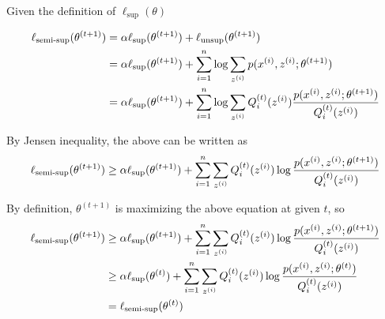 \begin{answer}

Given the definition of $\ell_\text{sup}(\theta)$

\begin{align}
    \ell_{\text{semi-sup}}(\theta^{(t+1)}) &= \alpha \ell_\text{sup}(\theta^{(t+1)}) + \ell_\text{unsup}(\theta^{(t+1)}) \\
    &= \alpha \ell_\text{sup}(\theta^{(t+1)}) +  \sum_{i=1}^{n} \log \sum_{z^{(i)}} p(x^{(i)},z^{(i)};\theta^{(t+1)}) \\
    &=  \alpha \ell_\text{sup}(\theta^{(t+1)}) +  \sum_{i=1}^{n} \log \sum_{z^{(i)}} Q^{(t)}_i(z^{(i)}) \frac{p(x^{(i)},z^{(i)};\theta^{(t+1)})}{Q^{(t)}_i(z^{(i)})} 
\end{align}

By Jensen inequality, the above can be written as 
\begin{align}
    \ell_{\text{semi-sup}}(\theta^{(t+1)}) \ge \alpha \ell_\text{sup}(\theta^{(t+1)}) + \sum_{i=1}^{n} \sum_{z^{(i)}} Q^{(t)}_i(z^{(i)}) \log \frac{ p(x^{(i)}, z^{(i)};\theta^{(t+1)}) }{ Q^{(t)}_i(z^{(i)})}
\end{align}

By definition, $\theta^{(t+1)}$ is maximizing the above equation at given $t$, so 
\begin{align}
    \ell_{\text{semi-sup}}(\theta^{(t+1)}) &\ge \alpha \ell_\text{sup}(\theta^{(t+1)}) + \sum_{i=1}^\nexp \sum_{\zsi} Q^{(t)}_i(\zsi) \log \frac{ p(\xsi, \zsi;\theta^{(t+1)}) }{ Q^{(t)}_i(\zsi)}  \\
    &\geq \alpha \ell_\text{sup}(\theta^{(t)}) + \sum_{i=1}^\nexp \sum_{\zsi} Q^{(t)}_i(\zsi) \log \frac{ p(\xsi, \zsi;\theta^{(t)}) }{ Q^{(t)}_i(\zsi)} \\
    &= \ell_{\text{semi-sup}}(\theta^{(t)}) %
\end{align}


\end{answer}
